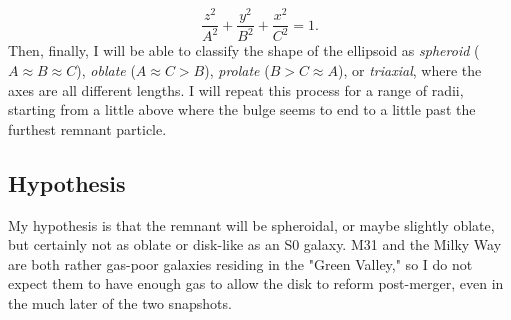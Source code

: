 \documentclass[linenumbers]{aastex631}
\begin{document}
\begin{equation}
    \frac{z^2}{A^2} + \frac{y^2}{B^2} + \frac{x^2}{C^2} = 1 .
\end{equation}
Then, finally, I will be able to classify the shape of the ellipsoid as \textit{spheroid} ($A \approx B \approx C$), \textit{oblate} ($A \approx C > B$), \textit{prolate} ($B > C \approx A$), or \textit{triaxial}, where the axes are all different lengths. 
I will repeat this process for a range of radii, starting from a little above where the bulge seems to end to a little past the furthest remnant particle.

\subsection{Hypothesis}

My hypothesis is that the remnant will be spheroidal, or maybe slightly oblate, but certainly not as oblate or disk-like as an S0 galaxy. 
M31 and the Milky Way are both rather gas-poor galaxies residing in the "Green Valley," so I do not expect them to have enough gas to allow the disk to reform post-merger, even in the much later of the two snapshots.



{}

\end{document}
